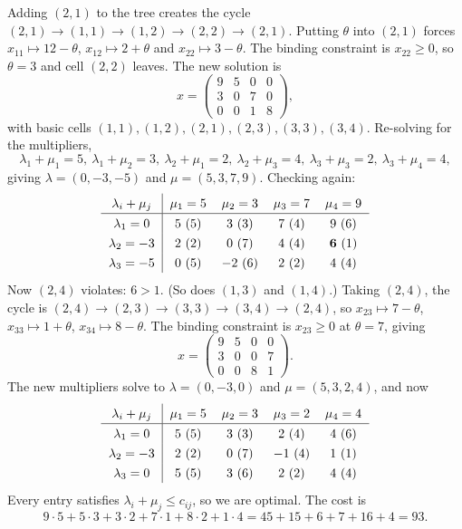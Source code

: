 \begin{example}
    Adding $(2,1)$ to the tree creates the cycle $(2,1) \rightarrow (1,1) \rightarrow (1,2) \rightarrow (2,2) \rightarrow (2,1)$. Putting $\theta$ into $(2,1)$ forces $x_{11} \mapsto 12 - \theta$, $x_{12}\mapsto 2 + \theta$ and $x_{22}\mapsto 3 - \theta$. The binding constraint is $x_{22} \geq 0$, so $\theta = 3$ and cell $(2,2)$ leaves. The new solution is
    $$
    x = \begin{pmatrix}9 & 5 & 0 & 0\\3&0&7&0\\0&0&1&8\end{pmatrix},
    $$
    with basic cells $(1,1),(1,2),(2,1),(2,3),(3,3),(3,4)$. Re-solving for the multipliers,
    $$
    \lambda_1 + \mu_1 = 5,\ \lambda_1+\mu_2 = 3,\ \lambda_2 + \mu_1 = 2,\ \lambda_2 + \mu_3 = 4,\ \lambda_3 + \mu_3 = 2,\ \lambda_3+\mu_4 = 4,
    $$
    giving $\lambda = (0,-3,-5)$ and $\mu = (5,3,7,9)$. Checking again:
    $$
    \arraycolsep=6pt\def\arraystretch{1.3}
    \begin{array}{c|cccc}
        \lambda_i + \mu_j & \mu_1 = 5 & \mu_2 = 3 & \mu_3 = 7 & \mu_4 = 9\\\hline
        \lambda_1 = 0 & 5\ (5) & 3\ (3) & 7\ (4) & 9\ (6)\\
        \lambda_2 = -3 & 2\ (2) & 0\ (7) & 4\ (4) & \mathbf{6}\ (1)\\
        \lambda_3 = -5 & 0\ (5) & -2\ (6) & 2\ (2) & 4\ (4)
    \end{array}
    $$
    Now $(2,4)$ violates: $6 > 1$. (So does $(1,3)$ and $(1,4)$.) Taking $(2,4)$, the cycle is $(2,4)\rightarrow(2,3)\rightarrow(3,3)\rightarrow(3,4)\rightarrow(2,4)$, so $x_{23}\mapsto 7 - \theta$, $x_{33}\mapsto 1 + \theta$, $x_{34}\mapsto 8 - \theta$. The binding constraint is $x_{23} \geq 0$ at $\theta = 7$, giving
    $$
    x = \begin{pmatrix}9&5&0&0\\3&0&0&7\\0&0&8&1\end{pmatrix}.
    $$
    The new multipliers solve to $\lambda = (0,-3,0)$ and $\mu = (5,3,2,4)$, and now
    $$
    \arraycolsep=6pt\def\arraystretch{1.3}
    \begin{array}{c|cccc}
        \lambda_i + \mu_j & \mu_1 = 5 & \mu_2 = 3 & \mu_3 = 2 & \mu_4 = 4\\\hline
        \lambda_1 = 0 & 5\ (5) & 3\ (3) & 2\ (4) & 4\ (6)\\
        \lambda_2 = -3 & 2\ (2) & 0\ (7) & -1\ (4) & 1\ (1)\\
        \lambda_3 = 0 & 5\ (5) & 3\ (6) & 2\ (2) & 4\ (4)
    \end{array}
    $$
    Every entry satisfies $\lambda_i + \mu_j \leq c_{ij}$, so we are optimal. The cost is
    $$
    9\cdot 5 + 5\cdot 3 + 3\cdot 2 + 7\cdot 1 + 8\cdot 2 + 1\cdot 4 = 45+15+6+7+16+4 = 93.
    $$
\end{example}

